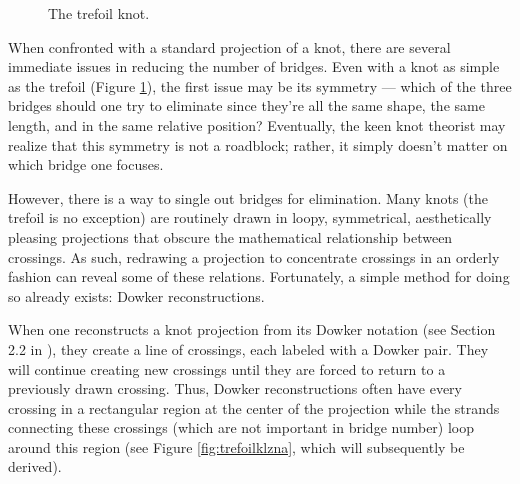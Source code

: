\documentclass[titlepage]{article}
\begin{document}
\begin{figure}[h!]
    \centering
    \vspace{-2.3em}
    \caption{The trefoil knot.}
    \label{fig:trefoil}
\end{figure}

\noindent When confronted with a standard projection of a knot, there are several immediate issues in reducing the number of bridges. Even with a knot as simple as the trefoil (Figure \ref{fig:trefoil}), the first issue may be its symmetry --- which of the three bridges should one try to eliminate since they're all the same shape, the same length, and in the same relative position? Eventually, the keen knot theorist may realize that this symmetry is not a roadblock; rather, it simply doesn't matter on which bridge one focuses.\par
However, there is a way to single out bridges for elimination. Many knots (the trefoil is no exception) are routinely drawn in loopy, symmetrical, aesthetically pleasing projections that obscure the mathematical relationship between crossings. As such, redrawing a projection to concentrate crossings in an orderly fashion can reveal some of these relations. Fortunately, a simple method for doing so already exists: Dowker reconstructions.\par
When one reconstructs a knot projection from its Dowker notation (see Section 2.2 in \cite{bib:knotnotes}), they create a line of crossings, each labeled with a Dowker pair. They will continue creating new crossings until they are forced to return to a previously drawn crossing. Thus, Dowker reconstructions often have every crossing in a rectangular region at the center of the projection while the strands connecting these crossings (which are not important in bridge number) loop around this region (see Figure \ref{fig:trefoilklzna}, which will subsequently be derived).\par
\end{document}
